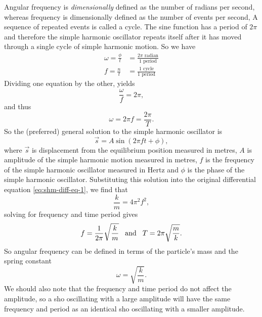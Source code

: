 Angular frequency is \textit{dimensionally} defined as the number of radians per second, whereas frequency is dimensionally defined as the number of events per second, A sequence of repeated events is called a cycle. The sine function has a period of $2 \pi$ and therefore the simple harmonic oscillator repeats itself after it has moved through a single cycle of simple harmonic motion. So we have
\begin{align*}
    \omega = \frac{\phi}{t} &= \frac{2\pi \text{ radian}}{1 \text{ period}} \\
    f = \frac{n}{t} &= \frac{1 \text{ cycle}}{1 \text{ period}}
\end{align*}
Dividing one equation by the other, yields 
\begin{equation*}
    \frac{\omega}{f} = 2 \pi,
\end{equation*}
and thus
\begin{equation}
    \omega = 2\pi f = \frac{2 \pi}{T}.
\end{equation}
So the (preferred) general solution to the simple harmonic oscillator is
\begin{equation}
    \vec{s} = A \sin (2 \pi ft + \phi), 
\end{equation}
where $\vec{s}$ is displacement from the equilibrium position measured in metres, $A$ is amplitude of the simple harmonic motion measured in metres, $f$ is the frequency of the simple harmonic oscillator measured in Hertz and $\phi$ is the phase of the simple harmonic oscillator. Substituting this solution into the original differential equation \ref{eq:shm-diff-eq-1}, we find that
\begin{equation*}
    \frac{k}{m} = 4 \pi^2 f^2,
\end{equation*}
solving for frequency and time period gives
\begin{equation*}
    f = \frac{1}{2\pi} \sqrt{\frac{k}{m}} \hspace{3mm} \text{and} \hspace{3mm} T = 2 \pi \sqrt{\frac{m}{k}}.
\end{equation*}
So angular frequency can be defined in terms of the particle's mass and the spring constant
\begin{equation}
    \omega = \sqrt{\frac{k}{m}}.
\end{equation}
We should also note that the frequency and time period do not affect the amplitude, so a sho oscillating with a large amplitude will have the same frequency and period as an identical sho oscillating with a smaller amplitude.

